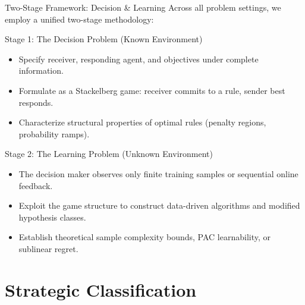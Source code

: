 \documentclass[aspectratio=169, 11pt, t, xcolor=table]{beamer}
\begin{document}
\begin{frame}{Two-Stage Framework: Decision \& Learning}
\small
Across all problem settings, we employ a unified two-stage methodology:
\par\vspace{0.4em}
\begin{block}{Stage 1: The Decision Problem (Known Environment)}
\footnotesize
\begin{itemize}\itemsep=2pt
\item Specify receiver, responding agent, and objectives under complete information.
\item Formulate as a Stackelberg game: receiver commits to a rule, sender best responds.
\item Characterize structural properties of optimal rules (penalty regions, probability ramps).
\end{itemize}
\end{block}

\par\vspace{0.4em}
\begin{block}{Stage 2: The Learning Problem (Unknown Environment)}
\footnotesize
\begin{itemize}\itemsep=2pt
\item The decision maker observes only finite training samples or sequential online feedback.
\item Exploit the game structure to construct data-driven algorithms and modified hypothesis classes.
\item Establish theoretical sample complexity bounds, PAC learnability, or sublinear regret.
\end{itemize}
\end{block}
\end{frame}



\section{Strategic Classification}
\end{document}
